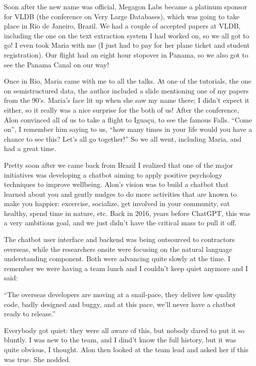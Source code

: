 \documentclass[12pt]{book}
\begin{document}
Soon after the new name was official, Megagon Labs became a platinum
sponsor for VLDB (the conference on Very Large Databases), which was
going to take place in Rio de Janeiro, Brazil. We had a couple of
accepted papers at VLDB, including the one on the text extraction system
I had worked on, so we all got to go! I even took Maria with me (I just
had to pay for her plane ticket and student registration). Our flight
had an eight hour stopover in Panama, so we also got to see the Panama
Canal on our way!

Once in Rio, Maria came with me to all the talks. At one of the
tutorials, the one on semistructured data, the author included a slide
mentioning one of my papers from the 90's. Maria's face lit up when she
saw my name there; I didn't expect it either, so it really was a nice
surprise for the both of us! After the conference, Alon convinced all of
us to take a flight to Iguaçu, to see the famous Falls. ``Come on'', I
remember him saying to us, ``how many times in your life would you have
a chance to see this? Let's all go together!'' So we all went, including
Maria, and had a great time.

Pretty soon after we came back from Brazil I realized that one of the
major initiatives was developing a chatbot aiming to apply positive
psychology techniques to improve wellbeing. Alon's vision was to build a
chatbot that learned about you and gently nudges to do more activities
that are known to make you happier: excercise, socialize, get involved
in your community, eat healthy, spend time in nature, etc. Back in 2016,
years before ChatGPT, this was a very ambitious goal, and we just didn't
have the critical mass to pull it off.

The chatbot user interface and backend was being outsourced to
contractors overseas, while the researchers onsite were focusing on the
natural language understanding component. Both were advancing quite
slowly at the time. I remember we were having a team lunch and I
couldn't keep quiet anymore and I said:

``The overseas developers are moving at a snail-pace, they deliver low
quality code, badly designed and buggy, and at this pace, we'll never
have a chatbot ready to release.''

Everybody got quiet: they were all aware of this, but nobody dared to
put it so bluntly. I was new to the team, and I dind't know the full
history, but it was quite obvious, I thought. Alon then looked at the
team lead and asked her if this was true. She nodded.
\end{document}
